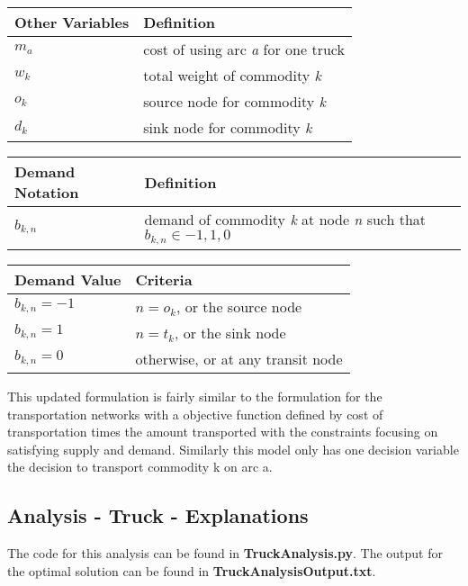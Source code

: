 \documentclass[
]{article}
\begin{document}
\begin{longtable}[]{@{}ll@{}}
\toprule
\textbf{Other Variables} & \textbf{Definition}\tabularnewline
\midrule
\endhead
\(m_a\) & cost of using arc \emph{a} for one truck\tabularnewline
\(w_k\) & total weight of commodity \emph{k}\tabularnewline
\(o_k\) & source node for commodity \emph{k}\tabularnewline
\(d_k\) & sink node for commodity \emph{k}\tabularnewline
\bottomrule
\end{longtable}

\begin{longtable}[]{@{}ll@{}}
\toprule
\textbf{Demand Notation} & \textbf{Definition}\tabularnewline
\midrule
\endhead
\(b_{k,n}\) & demand of commodity \emph{k} at node \emph{n} such that
\(b_{k,n}\in {-1,1,0}\)\tabularnewline
\bottomrule
\end{longtable}

\begin{longtable}[]{@{}ll@{}}
\toprule
\textbf{Demand Value} & \textbf{Criteria}\tabularnewline
\midrule
\endhead
\(b_{k,n} = -1\) & \(n=o_k\), or the source node\tabularnewline
\(b_{k,n} = 1\) & \(n=t_k\), or the sink node\tabularnewline
\(b_{k,n}= 0\) & otherwise, or at any transit node\tabularnewline
\bottomrule
\end{longtable}

This updated formulation is fairly similar to the formulation for the
transportation networks with a objective function defined by cost of
transportation times the amount transported with the constraints
focusing on satisfying supply and demand. Similarly this model only has
one decision variable the decision to transport commodity k on arc a.

\hypertarget{analysis---truck---explanations}{%
\subsection{Analysis - Truck -
Explanations}\label{analysis---truck---explanations}}

The code for this analysis can be found in \textbf{TruckAnalysis.py}.
The output for the optimal solution can be found in
\textbf{TruckAnalysisOutput.txt}.
\end{document}
